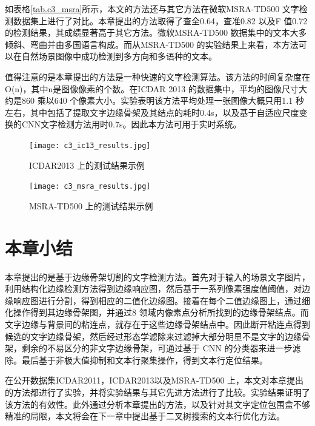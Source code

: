         如表格\ref{tab.c3_msra}所示，本文的方法还与其它方法在微软MSRA-TD500 文字检测数据集上进行了对比。本章提出的方法取得了查全0.64，查准0.82 以及F 值0.72 的检测结果，其成绩显著高于其它方法。微软MSRA-TD500 数据集中的文本大多倾斜、弯曲并由多国语言构成。而从MSRA-TD500 的实验结果上来看，本方法可以在自然场景图像中成功检测到多方向和多语种的文本。

        值得注意的是本章提出的方法是一种快速的文字检测算法。该方法的时间复杂度在O(n)，其中n是图像像素的个数。在ICDAR 2013 的数据集中，平均的图像尺寸大约是860 乘以640 个像素大小。实验表明该方法平均处理一张图像大概只用1.1 秒左右，其中包括了提取文字边缘骨架及其结点的耗时0.4s，以及基于自适应尺度变换的CNN文字检测方法用时0.7s。因此本方法可用于实时系统。

        \begin{figure}[!h]
        \centering
        \texttt{[image: c3\_ic13\_results.jpg]}
        \caption{ICDAR2013 上的测试结果示例}
        \label{fig.c3_ic13_results}
        \end{figure}

        \begin{figure}[!h]
        \centering
        \texttt{[image: c3\_msra\_results.jpg]}
        \caption{MSRA-TD500 上的测试结果示例}
        \label{fig.c3_msra_results}
        \end{figure}


    \section{本章小结}

    本章提出的是基于边缘骨架切割的文字检测方法。首先对于输入的场景文字图片，利用结构化边缘检测方法得到边缘响应图，然后基于一系列像素强度值阈值，对边缘响应图进行分割，得到相应的二值化边缘图。接着在每个二值边缘图上，通过细化操作得到其边缘骨架图，并通过8 领域内像素点分析所找到的边缘骨架结点。而文字边缘与背景间的粘连点，就存在于这些边缘骨架结点中。因此断开粘连点得到候选的文字边缘骨架，然后经过形态学滤除来过滤掉大部分明显不是文字的边缘骨架，剩余的不易区分的非文字边缘骨架，可通过基于 CNN 的分类器来进一步滤除。最后基于非极大值抑制和文本行聚集操作，得到文本行定位结果。

    在公开数据集ICDAR2011，ICDAR2013以及MSRA-TD500 上，本文对本章提出的方法都进行了实验，并将实验结果与其它先进方法进行了比较。实验结果证明了该方法的有效性。此外通过分析本章提出的方法，以及针对其文字定位包围盒不够精准的局限，本文将会在下一章中提出基于二叉树搜索的文本行优化方法。


